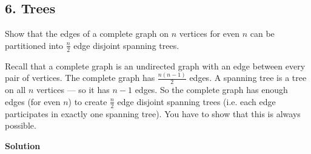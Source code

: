 \documentclass{article}
\begin{document}
\clearpage

\subsection*{6. Trees}
Show that the edges of a complete graph on $n$ vertices for even $n$ can be partitioned into $\frac n2$ edge disjoint spanning trees.

\noindent Recall that a complete graph is an undirected graph with an edge between every pair of vertices. The complete graph has $\frac{n(n-1)}{2}$ edges. A spanning tree is a tree on all $n$ vertices --- so it has $n-1$ edges. So the complete graph has enough edges (for even $n$) to create $\frac n2$ edge disjoint spanning trees (i.e. each edge participates in exactly one spanning tree). You have to show that this is always possible.
\begin{mdframed}
\textbf{Solution}

\end{mdframed}
\clearpage
\end{document}
